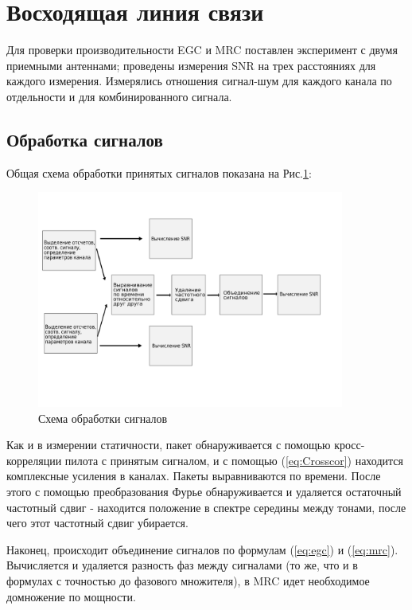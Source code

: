 \documentclass[a4paper,12pt,oneside, abstract=true]{scrartcl}
\begin{document}
\section{Восходящая линия связи}

Для проверки производительности EGC и MRC поставлен эксперимент с двумя приемными антеннами; проведены измерения SNR на трех расстояниях для каждого измерения. 
Измерялись отношения сигнал-шум для каждого канала по отдельности и для комбинированного сигнала.

\subsection{Обработка сигналов}

Общая схема обработки принятых сигналов показана на Рис.\ref{fig:SignalProcessing}:

\begin{figure}[!htb]
    \centering
    \includegraphics[width=0.9\textwidth]{pics/signalprocessing.png}
    \caption{Схема обработки сигналов}
    \label{fig:SignalProcessing}
\end{figure}

Как и в измерении статичности, пакет обнаруживается с помощью кросс-корреляции пилота с принятым сигналом, и с помощью (\ref{eq:Crosscor}) находится комплексные усиления в каналах. Пакеты выравниваются по времени.
После этого с помощью преобразования Фурье обнаруживается и удаляется остаточный частотный сдвиг - находится положение в спектре середины между тонами, после чего этот частотный сдвиг убирается.

Наконец, происходит объединение сигналов по формулам (\ref{eq:egc}) и (\ref{eq:mrc}). Вычисляется и удаляется разность фаз между сигналами (то же, что и в формулах с точностью до фазового множителя), в MRC идет необходимое домножение по мощности.
\end{document}
